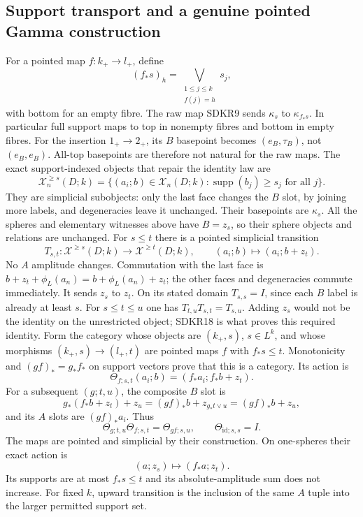 \subsection{Support transport and a genuine pointed Gamma construction}
For a pointed map $f:k_+\to l_+$, define
\begin{equation}\tag{SDKR17}
(f_*s)_h=\bigvee_{\substack{1\le j\le k\\ f(j)=h}}s_j,
\end{equation}
with bottom for an empty fibre. The raw map SDKR9 sends
$\kappa_s$ to $\kappa_{f_*s}$. In particular full support
maps to top in nonempty fibres and bottom in empty fibres.
For the insertion $1_+\to2_+$, its $B$ basepoint becomes
$(e_B,\tau_B)$, not $(e_B,e_B)$. All-top basepoints are
therefore not natural for the raw maps.
The exact support-indexed objects that repair the identity
law are
\begin{equation}\tag{SDKR18}
\mathcal X_n^{\ge s}(D;k)=
\{(a_i;b)\in\mathcal X_n(D;k):
             \operatorname{supp}(b_j)\ge s_j\text{ for all }j\}.
\end{equation}
They are simplicial subobjects: only the last face changes
the $B$ slot, by joining more labels, and degeneracies leave
it unchanged. Their basepoints are $\kappa_s$.
All the spheres and elementary witnesses above have $B=z_s$,
so their sphere objects and relations are unchanged.
For $s\le t$ there is a pointed simplicial transition
\begin{equation}\tag{SDKR19}
T_{s,t}:\mathcal X^{\ge s}(D;k)\to\mathcal X^{\ge t}(D;k),
\qquad (a_i;b)\mapsto(a_i;b+z_t).
\end{equation}
No $A$ amplitude changes. Commutation with the last face
is $b+z_t+\phi_L(a_n)=b+\phi_L(a_n)+z_t$;
the other faces and degeneracies commute immediately.
It sends $z_s$ to $z_t$. On its stated domain $T_{s,s}=I$,
since each $B$ label is already at least $s$.
For $s\le t\le u$ one has $T_{t,u}T_{s,t}=T_{s,u}$.
Adding $z_s$ would not be the identity on the unrestricted
object; SDKR18 is what proves this required identity.
Form the category whose objects are $(k_+,s)$, $s\in L^k$,
and whose morphisms $(k_+,s)\to(l_+,t)$ are pointed maps
$f$ with $f_*s\le t$. Monotonicity and
$(gf)_*=g_*f_*$ on support vectors prove that this is a
category. Its action is
\begin{equation}\tag{SDKR20}
\Theta_{f;s,t}(a_i;b)=(f_*a_i;f_*b+z_t).
\end{equation}
For a subsequent $(g;t,u)$, the composite $B$ slot is
\[
g_*(f_*b+z_t)+z_u
=(gf)_*b+z_{g_*t\vee u}
=(gf)_*b+z_u,
\]
and its $A$ slots are $(gf)_*a_i$. Thus
\begin{equation}\tag{SDKR21}
\Theta_{g;t,u}\Theta_{f;s,t}=\Theta_{gf;s,u},
\qquad \Theta_{\mathrm{id};s,s}=I.
\end{equation}
The maps are pointed and simplicial by their construction.
On one-spheres their exact action is
\begin{equation}\tag{SDKR22}
(a;z_s)\longmapsto(f_*a;z_t).
\end{equation}
Its supports are at most $f_*s\le t$ and its absolute-amplitude
sum does not increase. For fixed $k$, upward transition
is the inclusion of the same $A$ tuple into the larger
permitted support set.

